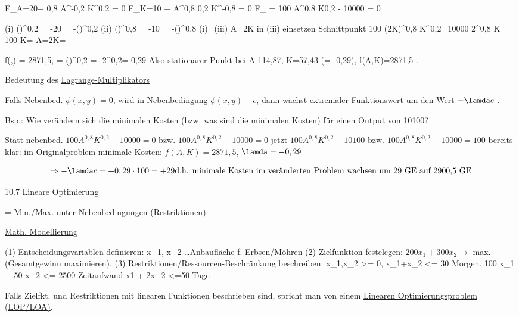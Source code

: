 F_A=20+ 0,8 A^{-0,2} K^{0,2} = 0		%
F_K=10 +  A^{0,8} 0,2 K^{-0,8} = 0	%
F_{\lamda} = 100 A^{0,8} K{0,2} - 10000 = 0		%

(i) ()^0,2 = -20
 \lamda = -()^0,2
(ii) ()^{0,8} = -10
\lamda = -()^{0,8}
(i)=(iii) \Rightarrow A=2K in (iii) einsetzen \Rightarrow Schnittpunkt
100 (2K)^{0,8} K^{0,2}=10000
2^{0,8} K = 100
K=
A=2K=

f(,) = 2871,5, \lamda=-()^{0,2} = -2^{0,2}=-0,29
Also stationärer Punkt bei A-114,87, K=57,43 (\lamda = -0,29), f(A,K)=2871,5 .

Bedeutung des \uline{Lagrange-Multiplikators} \lamda

Falls Nebenbed. $\phi(x,y)=0$,  wird in Nebenbedingung $\phi(x,y)-c$, dann wächst
\uline{extremaler Funktionswert} um den Wert $-\lamda c$ .

Bsp.: Wie verändern sich die minimalen Kosten (bzw. was sind die minimalen Kosten) für einen Output von 10100?

Statt nebenbed. $100A^{0,8} K^{0,2}-10000=0$ bzw. $100A^{0,8} K^{0,2}-10000=0$
jetzt  $100A^{0,8} K^{0,2}-10100$ bzw. $100A^{0,8} K ^{0,2} - 10000 = 100$
bereits klar: im Originalproblem minimale Kosten: $f(A,K)=2871,5$, $\lamda=-0,29$

\[
\Rightarrow -\lamda c = +0,29 \cdot 100 = +29 \text{d.h. minimale Kosten im veränderten Problem wachsen um 29~GE auf 2900,5~GE}
\]

10.7 Lineare Optimierung

 = Min./Max. unter Nebenbedingungen (Restriktionen).

\uline{Math. Modellierung}

(1) Entscheidungsvariablen definieren: x_1, x_2 \ldots Anbaufläche f. Erbsen/Möhren
(2) Zielfunktion festelegen: $200 x_1 + 300 x_2 \rightarrow $ max. (Gesamtgewinn maximieren).
(3) Restriktionen/Ressourcen-Beschränkung beschreiben: x_1,x_2 >= 0, x_1+x_2 <= 30 Morgen.
100 x_1 + 50 x_2 <= 2500 Zeitaufwand
x1 + 2x_2 <=50 Tage

Falls Zielfkt. und Restriktionen mit linearen Funktionen beschrieben sind, spricht man von einem \uline{Linearen Optimierungsproblem (LOP/LOA)}.
